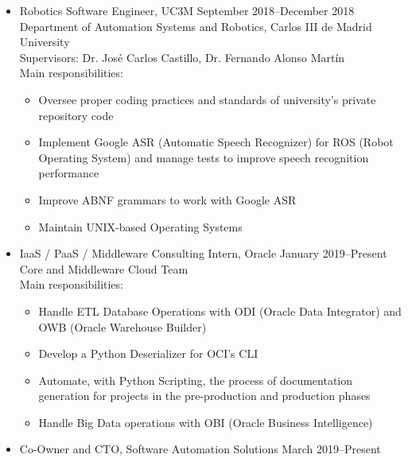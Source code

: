 \documentclass[11pt]{article}
\let\oldbibentry\bibentry
\renewcommand{\bibentry}[1]{\oldbibentry{#1}.}
\renewcommand{\section}[1]
{\vspace{1.0\baselineskip}{\Large\textbf{#1}}}
\begin{document}
\begin{itemize}[leftmargin=12pt]
  \item[] Robotics Software Engineer, UC3M \hfill September 2018--December 2018 \\
  Department of Automation Systems and Robotics, Carlos III de Madrid University \\
  Supervisors: Dr. José Carlos Castillo, Dr. Fernando Alonso Martín \\
  Main responsibilities:
  \begin{itemize}
      \item Oversee proper coding practices and standards of university's private repository code
      \item Implement Google ASR (Automatic Speech Recognizer) for ROS (Robot Operating System) and manage tests to improve speech recognition performance
      \item Improve ABNF grammars to work with Google ASR
      \item Maintain UNIX-based Operating Systems
  \end{itemize}
  \item[] IaaS / PaaS / Middleware Consulting Intern, Oracle \hfill January 2019--Present \\
  Core and Middleware Cloud Team \\
  Main responsibilities:
  \begin{itemize}
      \item Handle ETL Database Operations with ODI (Oracle Data Integrator) and OWB (Oracle Warehouse Builder)
      \item Develop a Python Deserializer for OCI's CLI 
      \item Automate, with Python Scripting, the process of documentation generation for projects in the pre-production and production phases
      \item Handle Big Data operations with OBI (Oracle Business Intelligence)
  \end{itemize}
  \item[] Co-Owner and CTO, Software Automation Solutions \hfill March 2019--Present \\
\end{itemize}


\end{document}
